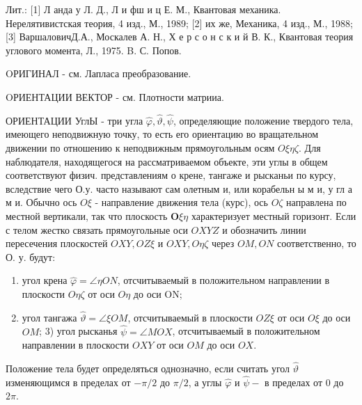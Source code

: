 \documentclass[10pt]{article}
\begin{document}
Лит.: [1] Л анда у Л. Д., Л и фш и ц Е. М., Квантовая механика. Нерелятивистская теория, 4 изд., М., 1989; [2] их же, Механика, 4 изд., М., 1988; [3] ВаршаловичД.А., Москалев А. Н., Х е р с о н с к и й В. К., Квантовая теория углового момента, Л., 1975. B. С. Попов.



OРИГИНАЛ - см. Лапласа преобразование.



OРИЕНТАЦИИ ВЕКТОР - см. Плотности матрииа.



ОРИЕНТАЦИИ УглЫ - три угла $\hat{\varphi}, \hat{\vartheta}, \hat{\psi}$, определяющие положение твердого тела, имеющего неподвижную точку, то есть его ориентацию во вращательном движении по отношению к неподвижным прямоугольным осям $O \xi \eta \zeta$. Для наблюдателя, находящегося на рассматриваемом объекте, эти углы в общем соответствуют физич. представлениям о крене, тангаже и рысканьи по курсу, вследствие чего О.у. часто называют сам олетным и, или корабельн ы м и, у гл а м и. Обычно ось $O \xi$ - направление движения тела (курс), ось $O \zeta$ направлена по местной вертикали, так что плоскость $\boldsymbol{O} \xi \eta$ характеризует местный горизонт. Если с телом жестко связать прямоугольные оси $O X Y Z$ и обозначить линии пересечения плоскостей $O X Y, O Z \xi$ и $O X Y, O \eta \zeta$ через $O M, O N$ соответственно, то О. у. будут:



\begin{enumerate}

  \item угол крена $\hat{\varphi}=\angle \eta O N$, отсчитываемый в положительном направлении в плоскости $O \eta \zeta$ от оси $O \eta$ до оси ON;



  \item угол тангажа $\hat{\vartheta}=\angle \xi O M$, отсчитываемый в плоскости $O Z \xi$ от оси $O \xi$ до оси $O M$; 3) угол рысканья $\hat{\psi}=\angle M O X$, отсчитываемый в положительном направлении в плоскости $O X Y$ от оси $O M$ до оси $O X$.



\end{enumerate}



Положение тела будет определяться однозначно, если считать угол $\hat{\vartheta}$ изменяющимся в пределах от $-\pi / 2$ до $\pi / 2$, а углы $\hat{\varphi}$ и $\hat{\psi}-$ в пределах от 0 до $2 \pi$.
\end{document}
